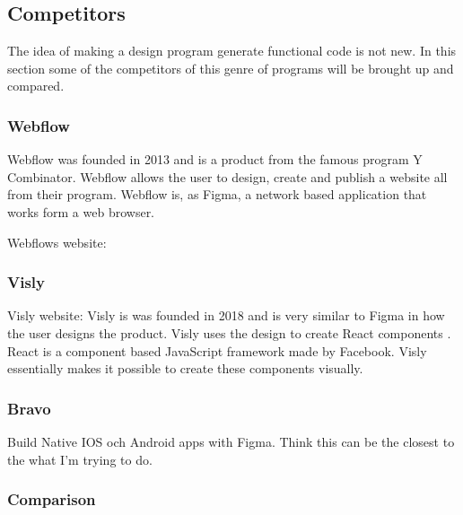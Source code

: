\subsection{Competitors}%
\label{sub:Competitors}
The idea of making a design program generate functional code is not new. In this section some of the competitors of this genre of programs will be brought up and compared.

\subsubsection{Webflow}
Webflow was founded in 2013 and is a product from the famous program Y Combinator. Webflow allows the user to design, create and publish a website all from their program. Webflow is, as Figma, a network based application that works form a web browser. 


Webflows website: \cite{ResponsiveWebDesign} 

\subsubsection{Visly}%
\label{ssub:Visly}
Visly website: \cite{vislyVisly} 
Visly is was founded in 2018 and is very similar to Figma in how the user designs the product. Visly uses the design to create React components \cite{facebookincReactJavaScriptLibrary}. React is a component based JavaScript framework made by Facebook. Visly essentially makes it possible to create these components visually.

\subsubsection{Bravo}%
\label{ssub:Bravo}

Build Native IOS och Android apps with Figma. Think this can be the closest to the what I'm trying to do. 

\subsubsection{Comparison}%
\label{ssub:Comparison}




